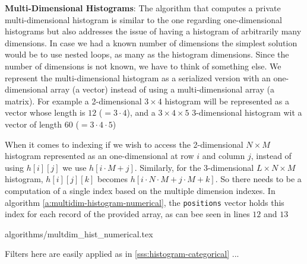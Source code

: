 \textbf{Multi-Dimensional Histograms}:
The algorithm that computes a private multi-dimensional histogram is similar to the one regarding one-dimensional histograms but also addresses the issue of having a histogram of arbitrarily many dimensions.
In case we had a known number of dimensions the simplest solution would be to use nested loops, as many as the histogram dimensions.
Since the number of dimensions is not known, we have to think of something else.
We represent the multi-dimensional histogram as a serialized version with an one-dimensional array (a vector) instead of using a multi-dimensional array (a matrix).
For example a 2-dimensional $3 \times 4$ histogram will be represented as a vector whose length is $ 12 $ ($= 3 \cdot 4$), and a $3 \times 4 \times 5$ 3-dimensional histogram wit a vector of length $ 60 $ ($= 3 \cdot 4 \cdot 5$)

When it comes to indexing if we wish to access the 2-dimensional $N \times M$ histogram represented as an one-dimensional at row $ i $ and column $ j $, instead of using $h[i][j]$ we use $h[i \cdot M + j]$.
Similarly, for the 3-dimensional $L \times N \times M$ histogram, $h[i][j][k]$ becomes $h[i \cdot N \cdot M + j \cdot M + k]$. So there needs to be a computation of a single index based on the multiple dimension indexes. In algorithm \ref{a:multidim-histogram-numerical}, the \texttt{positions} vector holds this index for each record of the provided array, as can bee seen in lines $ 12 $ and $ 13 $

{algorithms/multdim_hist_numerical.tex}


Filters here are easily applied as in \ref{sss:histogram-categorical} ... 


